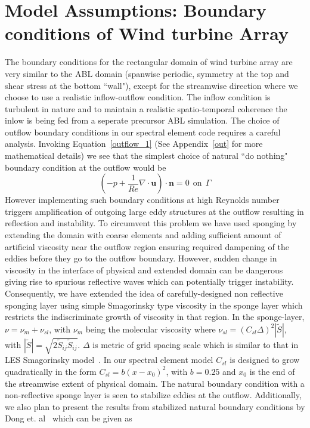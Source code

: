 \section{Model Assumptions: Boundary conditions of Wind turbine Array}\label{wtBC}
The boundary conditions for the rectangular domain of wind turbine array are very similar to the ABL domain (spanwise periodic, symmetry at the top and shear stress at the bottom ``wall"), except for the streamwise direction where we choose to use a realistic inflow-outflow condition. The inflow condition is turbulent in nature and to maintain a realistic spatio-temporal coherence the inlow is being fed from a seperate precursor ABL simulation. The choice of outflow boundary conditions in our spectral element code requires a careful analysis. Invoking Equation~\ref{outflow_1} (See Appendix~\ref{out} for more mathematical details) we see that the  simplest choice of natural ``do nothing" boundary condition at the outflow would be 
\begin{equation}
(-p + \frac{1}{Re}\nabla \cdot \mathbf{u})\cdot \mathbf{n} = 0 \ \ \mbox{on} \ \ \Gamma \label{nbc1}
\end{equation}
However implementing such boundary conditions at high Reynolds number triggers amplification of outgoing large eddy structures at the outflow resulting in reflection and instability. To circumvent this problem we have used sponging by extending the domain with coarse elements and adding sufficient amount of artificial viscosity near the outflow region ensuring required dampening of the eddies before they go to the outflow boundary. However, sudden change in viscosity in the interface of physical and extended domain can be dangerous giving rise to spurious reflective waves which can potentially trigger instability. Consequently, we have extended the idea of carefully-designed non reflective sponging layer using simple Smagorinsky type viscosity in the sponge layer which restricts the indiscriminate growth of viscosity in that region. In the sponge-layer, $\nu = \nu_m + \nu_{sl}$, with $\nu_m$ being the molecular viscosity where $\nu_{sl} = (C_{sl}\Delta)^2|\widetilde{S}|$, with $ |\widetilde{S}| = \sqrt{2\widetilde{S}_{ij}\widetilde{S}_{ij}}$. $\Delta$ is metric of grid spacing scale which is similar to that in LES Smagorinsky model~\cite{smagorinsky}. In our spectral element model $C_{sl}$ is designed to grow quadratically in the form $C_{sl} = b(x-x_0)^2$, with $b = 0.25$ and $x_0$ is the end of the streamwise extent of physical domain. The natural boundary condition with a non-reflective sponge layer is seen to stabilize eddies at the outflow. Additionally, we also plan to present the results from stabilized natural boundary conditions by Dong et. al~\cite{dong} which can be given as
